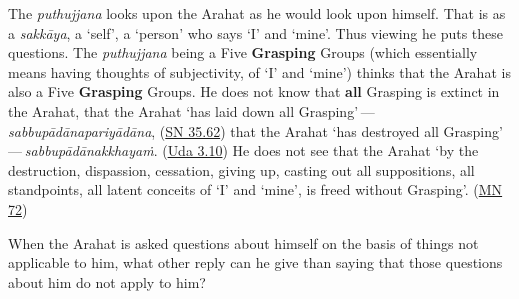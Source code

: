 The \emph{puthujjana} looks upon the Arahat as he would look upon himself. That is as a \emph{sakkāya}, a `self', a `person' who says `I' and `mine'. Thus viewing he puts these questions. The \emph{puthujjana} being a Five \textbf{Grasping} Groups (which essentially means having thoughts of subjectivity, of `I' and `mine') thinks that the Arahat is also a Five \textbf{Grasping} Groups. He does not know that \textbf{all} Grasping is extinct in the Arahat, that the Arahat `has laid down all Grasping' --- \emph{sabbupādānapariyādāna}, (\href{https://suttacentral.net/sn35.62/en/bodhi}{SN 35.62}) that the Arahat `has destroyed all Grasping' --- \emph{sabbupādānakkhayaṁ}. (\href{https://suttacentral.net/ud3.10/en/anandajoti}{Uda 3.10}) He does not see that the Arahat `by the destruction, dispassion, cessation, giving up, casting out all suppositions, all standpoints, all latent conceits of `I' and `mine', is freed without Grasping'. (\href{https://suttacentral.net/mn72/en/thanissaro}{MN 72})

When the Arahat is asked questions about himself on the basis of things not applicable to him, what other reply can he give than saying that those questions about him do not apply to him?

